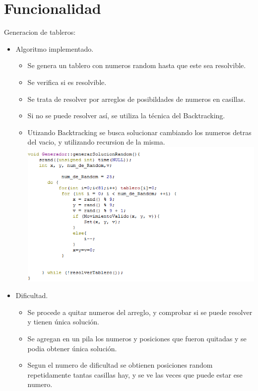 \documentclass[12pt,oneside]{book}
\begin{document}
\chapter{Funcionalidad}
\begin{center} Generacion de tableros:\end{center}
\begin{itemize}
\item  Algoritmo implementado.
\begin{itemize}
	\item Se genera un tablero con numeros random hasta que este sea resolvible.
	\item Se verifica si es resolvible.
	\item Se trata de resolver por arreglos de posibildades de numeros en casillas.
	\item Si no se puede resolver así, se utiliza la técnica del Backtracking. 
	\item Utizando Backtracking se busca solucionar cambiando los numeros detras del vacio, y utilizando recursion de la misma.
	\includegraphics[width=1.10\textwidth]{./imagenes/codigo_genrador.png}
\end {itemize}

\item  Dificultad.
\begin {itemize}
	\item Se procede a quitar numeros del arreglo, y comprobar si se puede resolver y tienen única solución.
	\item Se agregan en un pila los numeros y posiciones que fueron quitadas y se podia obtener única solución.
	\item Segun el numero de dificultad se obtienen posiciones random repetidamente tantas casillas hay, y se ve las veces 
	que puede estar ese numero.



\end{itemize}
\end{itemize}
\end{document}
